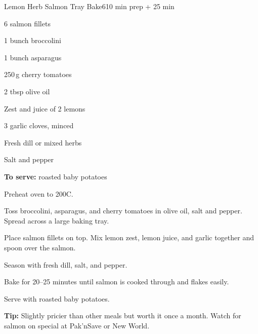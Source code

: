 \begin{recipebox}{Lemon Herb Salmon Tray Bake}{6}{10 min prep + 25 min}
\begin{ingredients}
  \item 6 salmon fillets
  \item 1 bunch broccolini
  \item 1 bunch asparagus
  \item 250\,g cherry tomatoes
  \item 2 tbsp olive oil
  \item Zest and juice of 2 lemons
  \item 3 garlic cloves, minced
  \item Fresh dill or mixed herbs
  \item Salt and pepper
  \item \textbf{To serve:} roasted baby potatoes
\end{ingredients}

\begin{method}
  \item Preheat oven to 200\textdegree C.
  \item Toss broccolini, asparagus, and cherry tomatoes in olive oil, salt and pepper. Spread across a large baking tray.
  \item Place salmon fillets on top. Mix lemon zest, lemon juice, and garlic together and spoon over the salmon.
  \item Season with fresh dill, salt, and pepper.
  \item Bake for 20--25 minutes until salmon is cooked through and flakes easily.
  \item Serve with roasted baby potatoes.
\end{method}

\begin{notelist}
  \item \textbf{Tip:} Slightly pricier than other meals but worth it once a month. Watch for salmon on special at Pak'nSave or New World.
\end{notelist}
\end{recipebox}
